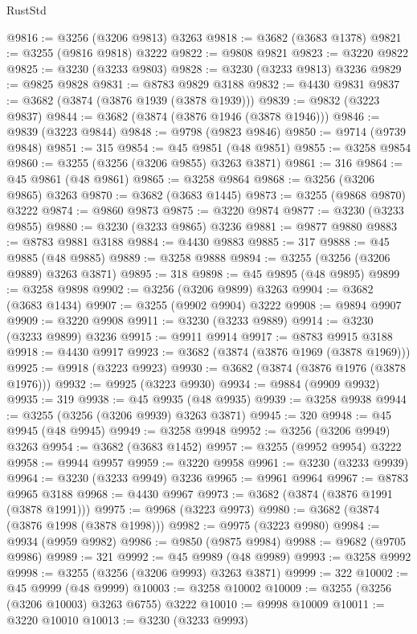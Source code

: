 \begin{lexlean}{RustStd}
\begin{coremodule}
@9816 := @3256 (@3206 @9813) @3263
@9818 := @3682 (@3683 @1378)
@9821 := @3255 (@9816 @9818) @3222
@9822 := @9808 @9821
@9823 := @3220 @9822
@9825 := @3230 (@3233 @9803)
@9828 := @3230 (@3233 @9813) @3236
@9829 := @9825 @9828
@9831 := @8783 @9829 @3188
@9832 := @4430 @9831
@9837 := @3682 (@3874 (@3876 @1939 (@3878 @1939)))
@9839 := @9832 (@3223 @9837)
@9844 := @3682 (@3874 (@3876 @1946 (@3878 @1946)))
@9846 := @9839 (@3223 @9844)
@9848 := @9798 (@9823 @9846)
@9850 := @9714 (@9739 @9848)
@9851 := 315
@9854 := @45 @9851 (@48 @9851)
@9855 := @3258 @9854
@9860 := @3255 (@3256 (@3206 @9855) @3263 @3871)
@9861 := 316
@9864 := @45 @9861 (@48 @9861)
@9865 := @3258 @9864
@9868 := @3256 (@3206 @9865) @3263
@9870 := @3682 (@3683 @1445)
@9873 := @3255 (@9868 @9870) @3222
@9874 := @9860 @9873
@9875 := @3220 @9874
@9877 := @3230 (@3233 @9855)
@9880 := @3230 (@3233 @9865) @3236
@9881 := @9877 @9880
@9883 := @8783 @9881 @3188
@9884 := @4430 @9883
@9885 := 317
@9888 := @45 @9885 (@48 @9885)
@9889 := @3258 @9888
@9894 := @3255 (@3256 (@3206 @9889) @3263 @3871)
@9895 := 318
@9898 := @45 @9895 (@48 @9895)
@9899 := @3258 @9898
@9902 := @3256 (@3206 @9899) @3263
@9904 := @3682 (@3683 @1434)
@9907 := @3255 (@9902 @9904) @3222
@9908 := @9894 @9907
@9909 := @3220 @9908
@9911 := @3230 (@3233 @9889)
@9914 := @3230 (@3233 @9899) @3236
@9915 := @9911 @9914
@9917 := @8783 @9915 @3188
@9918 := @4430 @9917
@9923 := @3682 (@3874 (@3876 @1969 (@3878 @1969)))
@9925 := @9918 (@3223 @9923)
@9930 := @3682 (@3874 (@3876 @1976 (@3878 @1976)))
@9932 := @9925 (@3223 @9930)
@9934 := @9884 (@9909 @9932)
@9935 := 319
@9938 := @45 @9935 (@48 @9935)
@9939 := @3258 @9938
@9944 := @3255 (@3256 (@3206 @9939) @3263 @3871)
@9945 := 320
@9948 := @45 @9945 (@48 @9945)
@9949 := @3258 @9948
@9952 := @3256 (@3206 @9949) @3263
@9954 := @3682 (@3683 @1452)
@9957 := @3255 (@9952 @9954) @3222
@9958 := @9944 @9957
@9959 := @3220 @9958
@9961 := @3230 (@3233 @9939)
@9964 := @3230 (@3233 @9949) @3236
@9965 := @9961 @9964
@9967 := @8783 @9965 @3188
@9968 := @4430 @9967
@9973 := @3682 (@3874 (@3876 @1991 (@3878 @1991)))
@9975 := @9968 (@3223 @9973)
@9980 := @3682 (@3874 (@3876 @1998 (@3878 @1998)))
@9982 := @9975 (@3223 @9980)
@9984 := @9934 (@9959 @9982)
@9986 := @9850 (@9875 @9984)
@9988 := @9682 (@9705 @9986)
@9989 := 321
@9992 := @45 @9989 (@48 @9989)
@9993 := @3258 @9992
@9998 := @3255 (@3256 (@3206 @9993) @3263 @3871)
@9999 := 322
@10002 := @45 @9999 (@48 @9999)
@10003 := @3258 @10002
@10009 := @3255 (@3256 (@3206 @10003) @3263 @6755) @3222
@10010 := @9998 @10009
@10011 := @3220 @10010
@10013 := @3230 (@3233 @9993)

\end{coremodule}
\end{lexlean}
